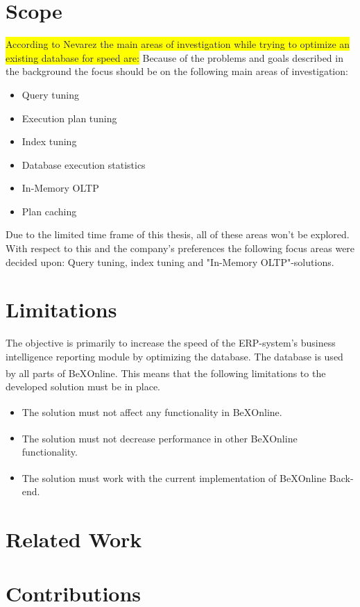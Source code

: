 \documentclass{cslthse-msc}
\newcommand{\hilight}[1]{\colorbox{yellow}{#1}}
\newcommand{\bex}{BeX\textsuperscript{\textregistered}}
\begin{document}
\section{Scope} \label{sec:scope}
\hilight{According to Nevarez\cite{Nevarez} the main areas of investigation while trying to optimize an existing database for speed are:}
Because of the problems and goals described in the background the focus should be on the following main areas of investigation:
\begin{itemize}
\item Query tuning
\item Execution plan tuning
\item Index tuning
\item Database execution statistics
\item In-Memory OLTP
\item Plan caching
\end{itemize}
Due to the limited time frame of this thesis, all of these areas won't be explored. With respect to this and the company's preferences the following focus areas were decided upon: Query tuning, index tuning and "In-Memory OLTP"-solutions.

\section{Limitations}

The objective is primarily to increase the speed of the ERP-system's business intelligence reporting module by optimizing the database. The database is used by all parts of \bex Online. This means that the following limitations to the developed solution must be in place.

\begin{itemize}
\item The solution must not affect any functionality in \bex Online.
\item The solution must not decrease performance in other \bex Online functionality.
\item The solution must work with the current implementation of \bex Online Back-end.
\end{itemize}

\section{Related Work}


\section{Contributions}
\end{document}
